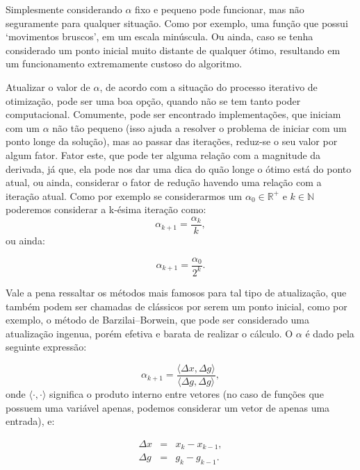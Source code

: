 Simplesmente considerando \(\alpha\) fixo e pequeno pode funcionar,
mas não seguramente para qualquer situação. Como por exemplo, uma função que
possui `movimentos bruscos', em um escala minúscula. Ou ainda, caso se tenha
considerado um ponto inicial muito distante de qualquer ótimo, resultando
em um funcionamento extremamente custoso do algoritmo.

Atualizar o valor de \(\alpha\), de acordo com a situação do processo iterativo
de otimização, pode ser uma boa opção, quando não se tem tanto poder
computacional. Comumente, pode ser encontrado implementações, que iniciam
com um \(\alpha\) não tão pequeno (isso ajuda a resolver o problema de
iniciar com um ponto longe da solução), mas ao passar das iterações,
reduz-se o seu valor por algum fator. Fator este, que pode ter alguma relação
com a magnitude da derivada, já que, ela pode nos dar uma dica do quão longe
o ótimo está do ponto atual, ou ainda, considerar o fator de redução havendo
uma relação com a iteração atual. Como por exemplo se considerarmos um
\(\alpha_0 \in \mathbb{R}^{+}\) e \(k \in \mathbb{N} \) poderemos considerar
a k-ésima iteração como:
\begin{equation}
    \alpha_{k+1} = \frac{\alpha_{k}}{k},
\end{equation}
ou ainda:

\begin{equation}
    \alpha_{k+1} = \frac{\alpha_{0}}{2^k}.
\end{equation}

Vale a pena ressaltar os métodos mais famosos para tal tipo de atualização,
que também podem ser chamadas de clássicos por serem um ponto inicial, como por
exemplo, o método de Barzilai–Borwein, que pode ser considerado uma atualização
ingenua, porém efetiva e barata de realizar o cálculo. O \(\alpha\) é dado
pela seguinte expressão:

\begin{equation}
    \alpha_{k+1} = \frac{\langle \Delta x, \Delta g \rangle}
        {\langle \Delta g, \Delta g \rangle},
\end{equation}
onde \( \langle \cdot, \cdot \rangle \) significa o produto interno entre
vetores (no caso de funções que possuem uma variável apenas, podemos
considerar um vetor de apenas uma entrada), e:

\begin{equation}
    \begin{array}{ccc}
        \Delta x& = &x_k - x_{k-1},\\
        \Delta g& = &g_k - g_{k-1}.
    \end{array}
\end{equation}


